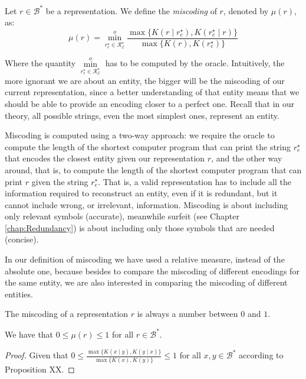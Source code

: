 \begin{definition} [Miscoding]
\label{def:miscoding}
Let $r \in \mathcal{B}^\ast$ be a representation. We define the \emph{miscoding} of $r$, denoted by $\mu(r)$, as:
\[
\mu(r) = \overset{o}{ \underset{ r^\star_e \in \mathcal{R}^\star_\mathcal{E} } \min} \frac{ \max\{ K \left( r \mid r^\star_e \right), K \left( r^\star_e \mid r \right) \} } { \max\{ K \left( r \right), K \left( r^\star_e \right) \} }
\]
\end{definition}

Where the quantity $\overset{o}{ \underset{ r^\star_e \in \mathcal{R}^\star_\mathcal{E} } \min}$ has to be computed by the oracle. Intuitively, the more ignorant we are about an entity, the bigger will be the miscoding of our current representation, since a better understanding of that entity means that we should be able to provide an encoding closer to a perfect one. Recall that in our theory, all possible strings, even the most simplest ones, represent an entity.

Miscoding is computed using a two-way approach: we require the oracle to compute the length of the shortest computer program that can print the string $r^\star_e$ that encodes the closest entity given our representation $r$, and the other way around, that is, to compute the length of the shortest computer program that can print $r$ given the string $r^\star_e$. That is, a valid representation has to include all the information required to reconstruct an entity, even if it is redundant, but it cannot include wrong, or irrelevant, information. Miscoding is about including only relevant symbols (accurate), meanwhile surfeit (see Chapter \ref{chap:Redundancy}) is about including only those symbols that are needed (concise).

In our definition of miscoding we have used a relative measure, instead of the absolute one, because besides to compare the miscoding of different encodings for the same entity, we are also interested in comparing the miscoding of different entities.

The miscoding of a representation $r$ is always a number between $0$ and $1$.

\begin{proposition}
\label{prop:range_miscoding}
We have that $0 \leq \mu(r) \leq 1$ for all $r \in \mathcal{B}^\ast$.
\end{proposition}
\begin{proof}
Given that $0 \leq \frac{ \max\{ K(x \mid y), K(y \mid x) \} } { \max\{ K(x), K(y) \} } \leq 1$ for all $x, y \in \mathcal{B}^\ast$ according to Proposition {\color{red} XX}.
\end{proof}

